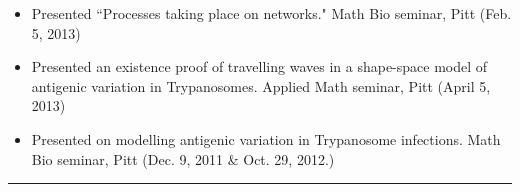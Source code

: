 \documentclass[a4paper,10pt]{article}
\newlength{\cvcolumngapwidth}
\newlength{\cvleftcolumnwidth}
\newlength{\cvrightcolumnwidth}
\newcommand{\cvsectionstyle}[1]{{\normalsize\cvsectionfont\textcolor{cvsectioncolor}{#1}}}
\newlength{\cvaftersectionskipamount}
\newlength{\cvbetweensectionandheadingextraskipamount}
\newcommand{\cvsection}[1]{
            \begin{minipage}[t]{\cvleftcolumnwidth}
                \raggedleft\cvsectionstyle{#1}
            \end{minipage}%
            \hspace{\cvcolumngapwidth}%
            \begin{minipage}[t]{\cvrightcolumnwidth}
                \textcolor{cvrulecolor}{\rule{\cvrightcolumnwidth}{0.3mm}}
            \end{minipage}
        
            \vspace{\cvaftersectionskipamount}
        }
\begin{document}
{\begin{itemize}[leftmargin=*]
                \item Presented ``Processes taking place on networks." Math Bio seminar, Pitt (Feb. 5, 2013)
                \item Presented an existence proof of travelling waves in a shape-space model of antigenic variation in Trypanosomes. Applied Math seminar, Pitt (April 5, 2013)
                \item Presented on modelling antigenic variation in Trypanosome infections. Math Bio seminar, Pitt (Dec. 9, 2011 \& Oct. 29, 2012.) 
            \end{itemize}
        
        }
        
         
        \newpage
        \cvsection{TEACHING EXPERIENCE}
        \vspace{\cvbetweensectionandheadingextraskipamount}
	
\end{document}
